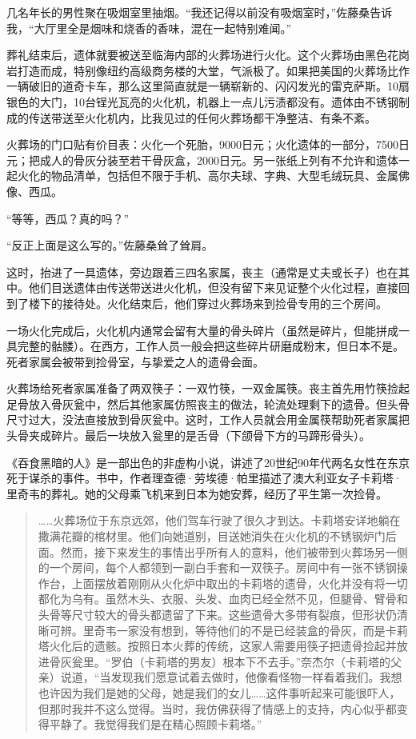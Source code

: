\documentclass[12pt,oneside]{book}
\begin{document}
\begin{bookref}[frametitle={\cite{好好告别：世界葬礼观察手记}}]
几名年长的男性聚在吸烟室里抽烟。“我还记得以前没有吸烟室时，”佐藤桑告诉我，“大厅里全是烟味和烧香的香味，混在一起特别难闻。”

葬礼结束后，遗体就要被送至临海内部的火葬场进行火化。这个火葬场由黑色花岗岩打造而成，特别像纽约高级商务楼的大堂，气派极了。如果把美国的火葬场比作一辆破旧的道奇卡车，那么这里简直就是一辆崭新的、闪闪发光的雷克萨斯。10扇银色的大门，10台锃光瓦亮的火化机，机器上一点儿污渍都没有。遗体由不锈钢制成的传送带送至火化机内，比我见过的任何火葬场都干净整洁、有条不紊。

火葬场的门口贴有价目表：火化一个死胎，9000日元；火化遗体的一部分，7500日元；把成人的骨灰分装至若干骨灰盒，2000日元。另一张纸上列有不允许和遗体一起火化的物品清单，包括但不限于手机、高尔夫球、字典、大型毛绒玩具、金属佛像、西瓜。

“等等，西瓜？真的吗？”

“反正上面是这么写的。”佐藤桑耸了耸肩。

这时，抬进了一具遗体，旁边跟着三四名家属，丧主（通常是丈夫或长子）也在其中。他们目送遗体由传送带送进火化机，但没有留下来见证整个火化过程，直接回到了楼下的接待处。火化结束后，他们穿过火葬场来到捡骨专用的三个房间。

一场火化完成后，火化机内通常会留有大量的骨头碎片（虽然是碎片，但能拼成一具完整的骷髅）。在西方，工作人员一般会把这些碎片研磨成粉末，但日本不是。死者家属会被带到捡骨室，与挚爱之人的遗骨会面。

火葬场给死者家属准备了两双筷子：一双竹筷，一双金属筷。丧主首先用竹筷捡起足骨放入骨灰瓮中，然后其他家属仿照丧主的做法，轮流处理剩下的遗骨。但头骨尺寸过大，没法直接放到骨灰瓮中。这时，工作人员就会用金属筷帮助死者家属把头骨夹成碎片。最后一块放入瓮里的是舌骨（下颌骨下方的马蹄形骨头）。

《吞食黑暗的人》是一部出色的非虚构小说，讲述了20世纪90年代两名女性在东京死于谋杀的事件。书中，作者理查德·劳埃德·帕里描述了澳大利亚女子卡莉塔·里奇韦的葬礼。她的父母乘飞机来到日本为她安葬，经历了平生第一次捡骨。

\begin{quotation}
……火葬场位于东京远郊，他们驾车行驶了很久才到达。卡莉塔安详地躺在撒满花瓣的棺材里。他们向她道别，目送她消失在火化机的不锈钢炉门后面。然而，接下来发生的事情出乎所有人的意料，他们被带到火葬场另一侧的一个房间，每个人都领到一副白手套和一双筷子。房间中有一张不锈钢操作台，上面摆放着刚刚从火化炉中取出的卡莉塔的遗骨，火化并没有将一切都化为乌有。虽然木头、衣服、头发、血肉已经全然不见，但腿骨、臂骨和头骨等尺寸较大的骨头都遗留了下来。这些遗骨大多带有裂痕，但形状仍清晰可辨。里奇韦一家没有想到，等待他们的不是已经装盒的骨灰，而是卡莉塔火化后的遗骸。按照日本火葬的传统，这家人需要用筷子把遗骨捡起并放进骨灰瓮里。“罗伯（卡莉塔的男友）根本下不去手。”奈杰尔（卡莉塔的父亲）说道，“当发现我们愿意试着去做时，他像看怪物一样看着我们。我想也许因为我们是她的父母，她是我们的女儿……这件事听起来可能很吓人，但那时我并不这么觉得。当时，我仿佛获得了情感上的支持，内心似乎都变得平静了。我觉得我们是在精心照顾卡莉塔。”
\end{quotation}


\end{bookref}
\end{document}
